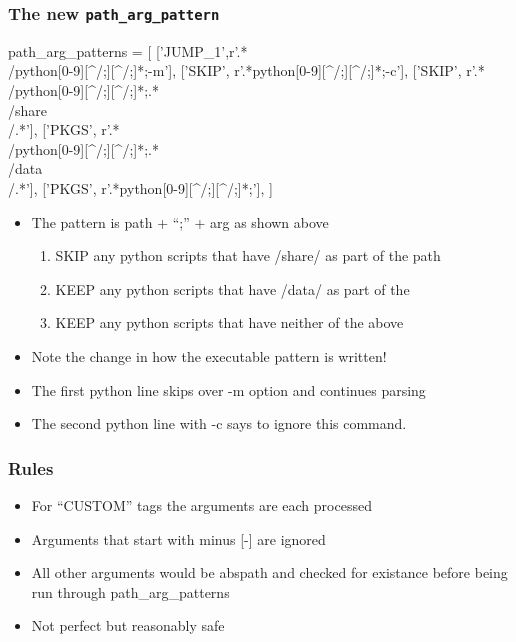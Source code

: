 \documentclass{beamer}
\begin{document}
\begin{frame}[fragile]
    \frametitle{The new \texttt{path\_arg\_pattern}}
 {\tiny
    \begin{semiverbatim}
path_arg_patterns = [
  ['JUMP_1',r'.*\\/python[0-9][^/;][^/;]*;-m'],
  ['SKIP',  r'.*\/python[0-9][^/;][^/;]*;-c'],
  ['SKIP',  r'.*\\/python[0-9][^/;][^/;]*;.*\\/share\\/.*'],
  ['PKGS',  r'.*\\/python[0-9][^/;][^/;]*;.*\\/data\\/.*'],
  ['PKGS',  r'.*\/python[0-9][^/;][^/;]*;'],
]
    \end{semiverbatim}
}
  \begin{itemize}
    \item The pattern is path + ``;'' + arg as shown above
      \begin{enumerate}
        \item SKIP any python scripts that have /share/ as part of the
          path
        \item KEEP any python scripts that have /data/ as part of the
        \item KEEP any python scripts that have neither of the above
      \end{enumerate}
    \item Note the change in how the executable pattern is written!
    \item The first python line skips over -m option and continues parsing
    \item The second python line with -c says to ignore this command.
  \end{itemize}

\end{frame}

\begin{frame}[fragile]
    \frametitle{Rules}
 {\tiny
    \begin{semiverbatim}
    \end{semiverbatim}
}
  \begin{itemize}
    \item For ``CUSTOM'' tags the arguments are each processed
    \item Arguments that start with minus [-] are ignored
    \item All other arguments would be abspath and checked for existance
      before being run through path\_arg\_patterns
    \item Not perfect but reasonably safe
  \end{itemize}
\end{frame}
\end{document}
